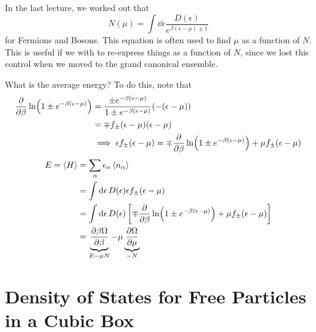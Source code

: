 \documentclass[a4paper,twoside,master.tex]{subfiles}
\begin{document}

In the last lecture, we worked out that
\begin{equation}
    N(\mu) = \int \dd{\epsilon} \frac{D(\epsilon)}{e^{\beta(\epsilon - \mu) \pm 1}}
\end{equation}
for Fermions and Bosons. This equation is often used to find $ \mu $ as a function of $ N $. This is useful if we with to re-express things as a function of $ N $, since we lost this control when we moved to the grand canonical ensemble.


What is the average energy? To do this, note that
\begin{align}
    \pdv{\beta} \ln(1\pm e^{- \beta(\epsilon - \mu)}) &= \frac{\pm e^{- \beta(\epsilon - \mu)}}{1 \pm e^{- \beta(\epsilon - \mu)}} (-(\epsilon - \mu)) \\
    &= \mp f_{\pm}(\epsilon - \mu) (\epsilon - \mu) \\
    & \implies \epsilon f_{\pm}(\epsilon - \mu) = \mp \pdv{\beta} \ln(1 \pm e^{- \beta(\epsilon - \mu)}) + \mu f_{\pm}(\epsilon - \mu)
\end{align}
\begin{align}
    E = \ev{H} &= \sum_{\alpha} \epsilon_{\alpha} \ev{n_{\alpha}} \\
    &= \int \dd{\epsilon} D(\epsilon) \epsilon f_{\pm}(\epsilon - \mu) \\
    &= \int \dd{\epsilon} D(\epsilon) \left[ \mp \pdv{\beta} \ln(1 \pm e^{- \beta(\epsilon - \mu)}) + \mu f_{\pm}(\epsilon - \mu) \right] \\
    &= \underbrace{\pdv{\beta \Omega}{\beta}}_{E - \mu N} - \mu \underbrace{\pdv{\Omega}{\mu}}_{-N} \\
\end{align}

\section{Density of States for Free Particles in a Cubic Box}
\label{sec:density_of_states_for_free_particles_in_a_cubic_box}
\end{document}
